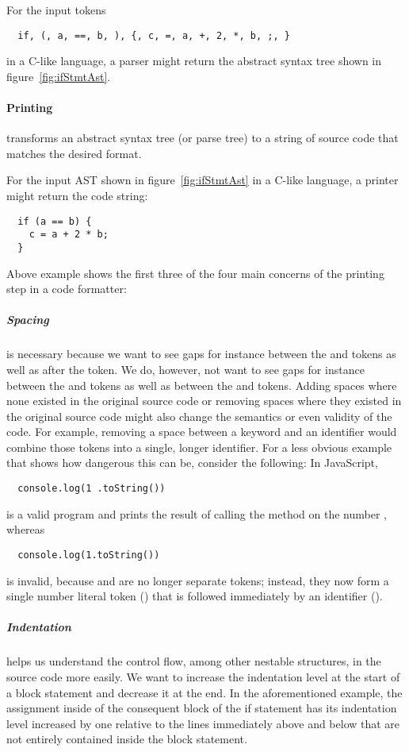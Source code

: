 For the input tokens
\begin{verbatim}
  if, (, a, ==, b, ), {, c, =, a, +, 2, *, b, ;, }
\end{verbatim}
in a C-like language, a parser might return the abstract syntax tree shown in figure~\ref{fig:ifStmtAst}.

\paragraph{Printing} transforms an abstract syntax tree (or parse tree)
to a string of source code that matches the desired format.

For the input AST shown in figure~\ref{fig:ifStmtAst} in a C-like language,
a printer might return the code string:

\begin{verbatim}
  if (a == b) {
    c = a + 2 * b;
  }
\end{verbatim}

Above example shows the first three of the four main concerns of the printing step in a code formatter:

\subparagraph{Spacing} is necessary because we want to see gaps for instance
between the  and \code{==} tokens as well as after the \code{)} token.
We do, however, not want to see gaps for instance
between the \code{(} and  tokens as well as between the  and \code{;} tokens.
Adding spaces where none existed in the original source code
or removing spaces where they existed in the original source code
might also change the semantics or even validity of the code.
For example, removing a space between a keyword and an identifier
would combine those tokens into a single, longer identifier.
For a less obvious example that shows how dangerous this can be, consider the following: In JavaScript,
\begin{verbatim}
  console.log(1 .toString())
\end{verbatim}
is a valid program and prints the result of
calling the method  on the number , whereas
\begin{verbatim}
  console.log(1.toString())
\end{verbatim}
is invalid, because  and  are no longer separate tokens;
instead, they now form a single number literal token ()
that is followed immediately by an identifier ().

\subparagraph{Indentation} helps us understand the control flow,
among other nestable structures, in the source code more easily.
We want to increase the indentation level at the start of a block statement and decrease it at the end.
In the aforementioned example, the assignment inside of the consequent block of the if statement
has its indentation level increased by one relative to the lines immediately above and below
that are not entirely contained inside the block statement.

